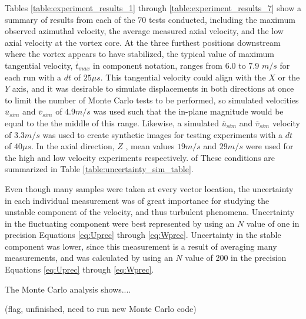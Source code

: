 Tables \ref{table:experiment_results_1} through 
\ref{table:experiment_results_7} show a summary of results from each of the 70 
tests conducted, including the maximum 
observed azimuthal velocity, the average measured axial velocity, and the low 
axial velocity at the vortex core. At the three furthest positions downstream 
where the vortex appears to have stabilized, the typical value of maximum 
tangential velocity, $\overline{t}_{max}$ in component notation, ranges from 
6.0 to 7.9 $m/s$ for each run with a $dt$ of $25 \mu s$. This tangential 
velocity could align with the $X$ or the $Y$ axis, and 
it was desirable to simulate displacements in both directions at once to limit 
the number of Monte Carlo tests to be performed, so simulated velocities
$\overline{u}_{sim}$ and $\overline{v}_{sim}$
of $4.9 m/s$ was used such that the in-plane magnitude would be equal 
to the the middle of this range. Likewise, a simulated $\overline{u}_{sim}$ and 
$\overline{v}_{sim}$  velocity of 
$3.3 m/s$ was used to create synthetic images for testing experiments with a 
$dt$ of $40 \mu s$. In the axial direction, $Z$ , mean values $19 m/s$ and $29 
m/s$ were used for the high and low velocity experiments respectively. of These 
conditions are summarized in Table \ref{table:uncertainty_sim_table}.



Even though many samples were taken at every vector location, the uncertainty 
in each individual measurement was of great importance for studying the 
unstable component of the velocity, and thus turbulent phenomena. Uncertainty 
in the fluctuating component were best represented by using an $N$ 
value of one in precision Equations \ref{eq:Uprec} through \ref{eq:Wprec}. 
Uncertainty in the stable component was lower, since this measurement is a 
result of averaging many measurements, and was calculated by using an $N$ value 
of 200 in the precision Equations \ref{eq:Uprec} through \ref{eq:Wprec}.


The Monte Carlo analysis shows....

(flag, unfinished, need to run new Monte Carlo code)